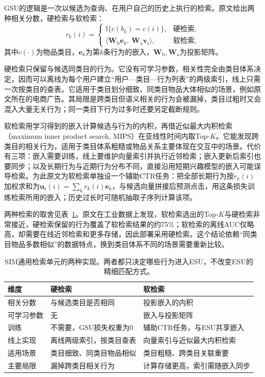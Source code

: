 GSU的逻辑是一次以候选为查询、在用户自己的历史上执行的检索。原文给出两种相关分数，硬检索与软检索：
\begin{equation}
  r_k(i)=
  \begin{cases}
    \mathbb{I}\{c(b_k)=c(i)\}, & \text{硬检索},\\
    \langle\bm{W}_{\mathrm b}\bm{e}_k,\ \bm{W}_{\mathrm a}\bm{v}_i\rangle, & \text{软检索},
  \end{cases}
  \label{eq:rs-sim-gsu}
\end{equation}
其中$c(\cdot)$为物品类目，$\bm{e}_k$为第$k$条行为的嵌入，$\bm{W}_{\mathrm b},\bm{W}_{\mathrm a}$为投影矩阵。

硬检索只保留与候选同类目的行为。它没有可学习参数，相关性完全由类目体系决定，因而可以离线为每个用户建立“用户—类目—行为列表”的两级索引，线上只需一次按类目的查表。它适用于类目划分细致、同类目物品大体相似的场景，例如原文所在的电商广告。其局限是跨类目但语义相关的行为会被漏掉，类目过粗时又会混入大量无关行为；同一类目下行为过多时还要另定截断规则。

软检索用学习得到的嵌入计算候选与行为的内积，再借近似最大内积检索（maximum inner product search, MIPS）在亚线性时间内取Top-$K$。它能发现跨类目的相关行为，适用于类目体系粗糙或物品关系主要体现在交互中的场景。代价有三项：嵌入需要训练，线上要维护向量索引并执行近邻检索；嵌入更新后索引也要同步；以及长期行为与近期行为分布不同，直接沿用短期兴趣模型的嵌入可能误导检索。为此原文为软检索单独设一个辅助CTR任务：把全部长期行为按$r_k(i)$加权求和为$\bm{u}_{\mathrm r}(i)=\sum_k r_k(i)\bm{e}_k$，与候选向量拼接后预测点击，用这条损失训练检索所用的嵌入；历史过长时可随机抽取子序列计算该项。

两种检索的取舍见表~\ref{tab:rs-sim-gsu-comparison}。原文在工业数据上发现，软检索选出的Top-$K$与硬检索非常接近，硬检索保留的行为覆盖了软检索结果的约75\%；软检索的离线AUC仅略高，却需要在线近邻检索和更多存储，因此部署采用硬检索。这个结论依赖“同类目物品多数相似”的数据特点，换到类目体系不同的场景需要重新比较。

\begin{table}[htbp]
  \centering
  \small
  \begin{tabularx}{\linewidth}{@{}lXX@{}}
    \toprule
    维度 & 硬检索 & 软检索 \\
    \midrule
    相关分数 & 与候选类目是否相同 & 投影嵌入的内积 \\
    可学习参数 & 无 & 嵌入与投影矩阵 \\
    训练 & 不需要，GSU损失权重为0 & 辅助CTR任务，与ESU共享嵌入 \\
    线上实现 & 离线两级索引，按类目查表 & 向量索引与近似最大内积检索 \\
    适用场景 & 类目细致、同类目物品相似 & 类目粗糙、跨类目关联重要 \\
    主要局限 & 漏掉跨类目相关行为 & 计算存储更高，索引需随嵌入同步 \\
    \bottomrule
  \end{tabularx}
  \caption{SIM通用检索单元的两种实现。两者都只决定哪些行为进入ESU，不改变ESU的精细匹配方式。}
  \label{tab:rs-sim-gsu-comparison}
\end{table}


